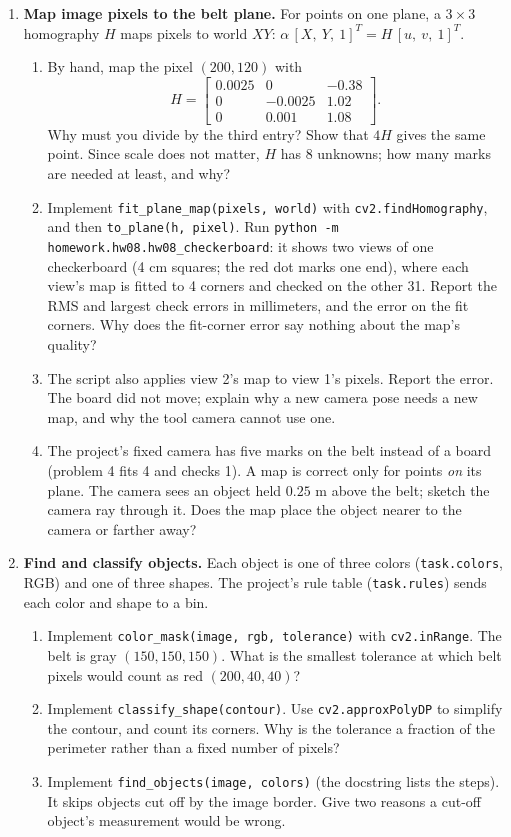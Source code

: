 \begin{enumerate}
\item \textbf{Map image pixels to the belt plane.}
For points on one plane, a $3\times3$ homography $H$ maps pixels to world
$XY$: $\alpha\,[X,\ Y,\ 1]^T=H\,[u,\ v,\ 1]^T$.
\begin{enumerate}
\item By hand, map the pixel $(200,120)$ with
\[
H=\begin{bmatrix}0.0025&0&-0.38\\0&-0.0025&1.02\\0&0.001&1.08\end{bmatrix}.
\]
Why must you divide by the third entry? Show that $4H$ gives the same
point. Since scale does not matter, $H$ has 8 unknowns; how many marks are
needed at least, and why?
\item Implement \texttt{fit\_plane\_map(pixels, world)} with
\texttt{cv2.findHomography}, and then \texttt{to\_plane(h, pixel)}. Run
\texttt{python -m homework.hw08.hw08\_checkerboard}: it shows two views of one
checkerboard (4 cm squares; the red dot marks one end), where each view's
map is fitted to 4 corners and checked on the other 31. Report the RMS and
largest check errors in millimeters, and the error on the fit corners. Why
does the fit-corner error say nothing about the map's quality?
\item The script also applies view 2's map to view 1's pixels. Report the
error. The board did not move; explain why a new camera pose needs a new
map, and why the tool camera cannot use one.
\item The project's fixed camera has five marks on the belt instead of a
board (problem 4 fits 4 and checks 1). A map is correct only for points
\emph{on} its plane. The camera sees an object held $0.25$ m above the
belt; sketch the camera ray through it. Does the map place the object
nearer to the camera or farther away?
\end{enumerate}

\item \textbf{Find and classify objects.}
Each object is one of three colors (\texttt{task.colors}, RGB) and one of
three shapes. The project's rule table (\texttt{task.rules}) sends each
color and shape to a bin.
\begin{enumerate}
\item Implement \texttt{color\_mask(image, rgb, tolerance)} with
\texttt{cv2.inRange}. The belt is gray $(150,150,150)$. What is the smallest
tolerance at which belt pixels would count as red $(200,40,40)$?
\item Implement \texttt{classify\_shape(contour)}. Use
\texttt{cv2.approxPolyDP} to simplify the contour, and count its corners. Why
is the tolerance a fraction of the perimeter rather than a fixed number of
pixels?
\item Implement \texttt{find\_objects(image, colors)} (the docstring lists
the steps). It skips objects cut off by the image border. Give two reasons a
cut-off object's measurement would be wrong.
\end{enumerate}


\end{enumerate}
